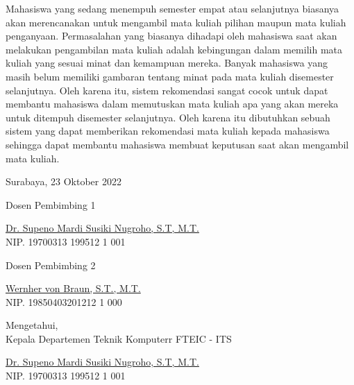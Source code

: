 Mahasiswa yang sedang menempuh semester empat atau selanjutnya biasanya akan merencanakan
untuk mengambil mata kuliah pilihan maupun mata kuliah penganyaan. Permasalahan yang biasanya dihadapi oleh mahasiswa
saat akan melakukan pengambilan mata kuliah adalah kebingungan dalam memilih mata kuliah
yang sesuai minat dan kemampuan mereka. Banyak mahasiswa yang masih belum memiliki gambaran
tentang minat pada mata kuliah disemester selanjutnya. Oleh karena itu, sistem rekomendasi
sangat cocok untuk dapat membantu mahasiswa dalam memutuskan mata kuliah apa yang akan mereka
untuk ditempuh disemester selanjutnya. Oleh karena itu dibutuhkan sebuah sistem yang dapat memberikan
rekomendasi mata kuliah kepada mahasiswa sehingga dapat membantu mahasiswa membuat keputusan saat akan
mengambil mata kuliah.
\vspace{1ex}

\begin{flushright}
  Surabaya, 23 Oktober 2022
\end{flushright}
\vspace{1ex}

\begin{center}

  \begin{multicols}{2}

    Dosen Pembimbing 1
    \vspace{12ex}

    \underline{Dr. Supeno Mardi Susiki Nugroho, S.T, M.T.} \\
    NIP. 19700313 199512 1 001

    \columnbreak

    Dosen Pembimbing 2
    \vspace{12ex}

    \underline{Wernher von Braun, S.T., M.T.} \\
    NIP. 19850403201212 1 000

  \end{multicols}


  \vspace{6ex}

  Mengetahui, \\
  Kepala Departemen Teknik Komputerr FTEIC - ITS
  \vspace{12ex}

  \underline{Dr. Supeno Mardi Susiki Nugroho, S.T, M.T.} \\
  NIP. 19700313 199512 1 001

\end{center}
